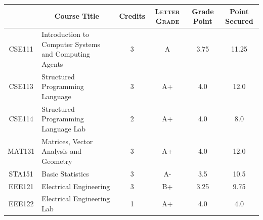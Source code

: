 \documentclass[11pt]{article}
\newcommand*{\numtwo}[1]{\pgfmathprintnumber[
                    fixed, precision=2, fixed zerofill=true]{#1}}
\begin{document}
                \begin{center}
                    \renewcommand{\arraystretch}{1.08}
                    
                \begin{tabular}{|c|l|c|>{\scshape}c|c|c|}
                \hline  \rule[-1ex]{0pt}{3.5ex} {\centering{\bf Course Code}} &  \multicolumn{1}{c|}{\textbf{Course Title}}  & {\bf Credits} & {\bf Letter Grade} & {\bf Grade Point} & {\bf Point Secured}  \\ 
                \hline   CSE111 &  Introduction to Computer Systems and Computing Agents		 & 3 & A & 3.75 & 11.25 \\ %
                \hline   CSE113 &  Structured Programming Language		 & 3 & A+ & 4.0 & 12.0 \\ %
                \hline   CSE114 &  Structured Programming Language Lab		 & 2 & A+ & 4.0 & 8.0 \\ %
                \hline   MAT131 &  Matrices, Vector Analysis and Geometry		 & 3 & A+ & 4.0 & 12.0 \\ %
                \hline   STA151 &  Basic Statistics		 & 3 & A- & 3.5 & 10.5 \\ %
                \hline   EEE121 &  Electrical Engineering		 & 3 & B+ & 3.25 & 9.75 \\ %
                \hline   EEE122 &  Electrical Engineering Lab		 & 1 & A+ & 4.0 & 4.0 \\ %

\hline                %
                \end{tabular}
                \end{center}
                \renewcommand{\arraystretch}{1.03}
\end{document}
